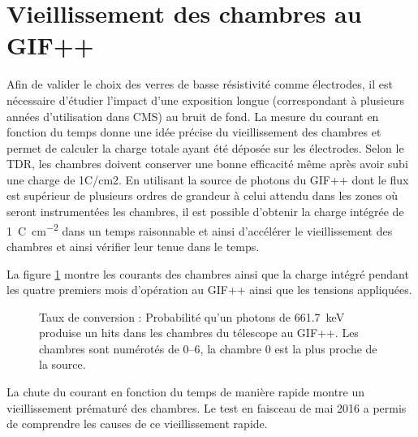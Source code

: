 \section{Vieillissement des chambres au GIF++}
Afin de valider le choix des verres de basse résistivité comme électrodes, il est nécessaire d'étudier l'impact d'une exposition longue (correspondant à plusieurs années d'utilisation dans CMS) au bruit de fond. La mesure du courant en fonction du temps donne une idée précise du vieillissement des chambres et permet de calculer la charge totale ayant été déposée sur les électrodes. Selon le TDR, les chambres doivent conserver une bonne efficacité même après avoir subi une charge de 1C/cm2. En utilisant la source de photons du GIF++ dont le flux est supérieur de plusieurs ordres de grandeur à celui attendu dans les zones où seront instrumentées les chambres, il est possible d'obtenir la charge intégrée de \SI{1}{\coulomb\per\square\centi\meter} dans un temps raisonnable et ainsi d'accélérer le vieillissement des chambres et ainsi vérifier leur tenue dans le temps.

La figure \ref{Courant} montre les courants des chambres ainsi que la charge intégré pendant les quatre premiers mois d'opération au GIF++ ainsi que les tensions appliquées. 

\begin{figure}[!ht]
	\centering
	\caption{Taux de conversion : Probabilité qu'un photons de \SI{661.7}{\kilo\eV} produise un hits dans les chambres du télescope au GIF++. Les chambres sont numérotés de \SIrange{0}{6}{}, la chambre \num{0} est la plus proche de la source.}
	\label{Courant}
\end{figure}


La chute du courant en fonction du temps de manière rapide montre un vieillissement prématuré des chambres. Le test en faisceau de mai 2016 a permis de comprendre les causes de ce vieillissement rapide.

